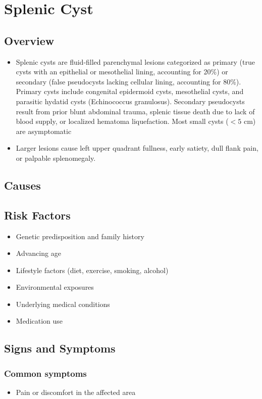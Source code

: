 \chapter{Splenic Cyst}
\label{sec:Splenic Cyst}

\section{Overview}


\begin{itemize}[noitemsep]
  \item Splenic cysts are fluid-filled parenchymal lesions categorized as primary (true cysts with an epithelial or mesothelial lining, accounting for 20\%) or secondary (false pseudocysts lacking cellular lining, accounting for 80\%). Primary cysts include congenital epidermoid cysts, mesothelial cysts, and parasitic hydatid cysts (Echinococcus granulosus). Secondary pseudocysts result from prior blunt abdominal trauma, splenic tissue death due to lack of blood supply, or localized hematoma liquefaction. Most small cysts ($<5$ cm) are asymptomatic
  \item Larger lesions cause left upper quadrant fullness, early satiety, dull flank pain, or palpable splenomegaly.
\end{itemize}
\section{Causes}
\section{Risk Factors}

\begin{itemize}[noitemsep]
  \item Genetic predisposition and family history
  \item Advancing age
  \item Lifestyle factors (diet, exercise, smoking, alcohol)
  \item Environmental exposures
  \item Underlying medical conditions
  \item Medication use
\end{itemize}
\section{Signs and Symptoms}

\subsection{Common symptoms}
\begin{itemize}[noitemsep]
  \item Pain or discomfort in the affected area
  \end{itemize}

